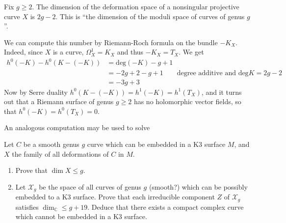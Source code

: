 \begin{example}
\label{example-moduli-space-of-nonsingular-Riemann-surfaces-of-genus-g}
\begin{reference}
\cite[Example 3.1]{continued-fractions}
\end{reference}
Fix $g \geq 2$. The dimension of the deformation space of a nonsingular
projective curve $X$ is $2g-2$. This is ``the dimension of the moduli space of
curves of genus $g$''.
 
We can compute this number by Riemann-Roch formula on the bundle $-K_X$. 
Indeed, since $X$ is a curve, $\Omega_X^1=K_X$ and thus $-K_X=T_X$. We get
\begin{align*}
h^0(-K)-h^0(K-(-K))&=\text{deg}(-K)-g+1\\
&=-2g+2-g+1\qquad \text{degree additive and $\text{deg}K=2g-2$}\\
&=-3g+3
\end{align*}
Now by Serre duality $h^0(K-(-K))=h^1(-K)=h^1(T_X)$, and it turns out that a
Riemann surface of genus $g \geq 2$ has no holomorphic vector fields, so that
$h^0(-K)=h^0(T_X)=0$.
\end{example}

An analogous computation may be used to solve

\begin{exercise}
\label{exercise-deformations-of-curves-in-K3}
Let $C$ be a smooth genus $g$ curve which can be embedded in a K3 surface  $M$,
and $X$ the family of all deformations of $C$ in $M$.
\begin{enumerate}
\item Prove that $\dim X \leq  g$.
\item Let $\mathcal{X}_g$ be the space of all curves of genus $g$ (smooth?)
which can be possibly embedded to a K3 surface. Prove that each irreducible
component $Z$ of $\mathcal{X}_g$ satisfies $\dim_\mathbb{C} \leq  g+19$. Deduce
that there exists a compact complex curve which cannot be embedded in a K3
surface.
\end{enumerate}
\end{exercise}

